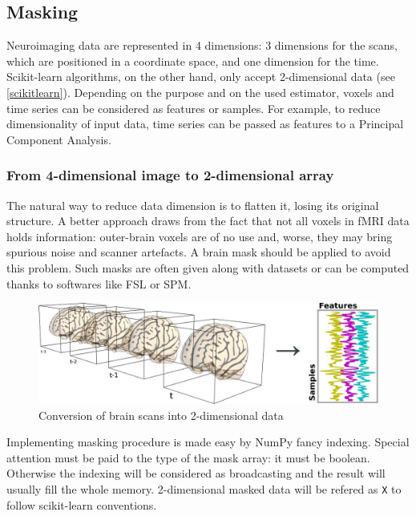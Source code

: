\documentclass{frontiersSCNS} %
\begin{document}
\subsection{Masking}

Neuroimaging data are represented in 4 dimensions: 3 dimensions for the scans,
which are positioned in a coordinate space, and one dimension for the time.
Scikit-learn algorithms, on the other hand, only accept 2-dimensional data (see
\ref{scikitlearn}).
Depending on the purpose and on the used estimator, voxels and time series can be
considered as features
or samples. For example, to reduce dimensionality of input data,
time series can be passed as features to a Principal Component Analysis.

\subsubsection{From 4-dimensional image to 2-dimensional array}

The natural way to reduce data dimension is to flatten it, losing its original
structure. A better approach draws from the fact that not all voxels in fMRI data
holds information: outer-brain voxels are of no
use and, worse, they may bring spurious noise and scanner artefacts.
A brain mask should be applied to avoid this problem. Such masks
are often given along with datasets or can be computed thanks to softwares like
FSL or SPM.\\

\begin{figure}[hbtp]
    \begin{center}
        \includegraphics[width=.5\linewidth]{img/niimgs.jpg}
    \end{center}
    \caption{Conversion of brain scans into 2-dimensional data}
    \label{fig:niimg}
\end{figure}

Implementing masking procedure is made easy by NumPy fancy
indexing. Special attention must be paid to the type of the mask array: it must
be boolean. Otherwise the indexing will be considered as broadcasting and the
result will usually fill the whole memory.
2-dimensional masked data will be refered as \texttt{X} to follow scikit-learn
conventions.
\end{document}
